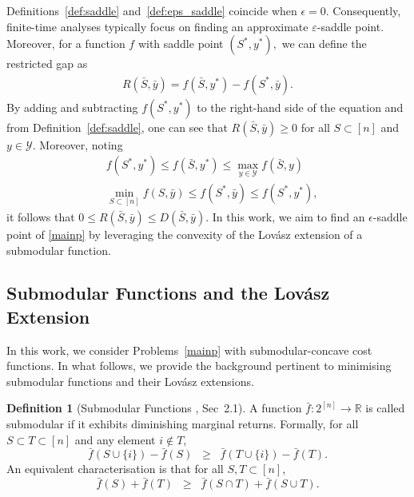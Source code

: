 \documentclass{article}
\theoremstyle{plain}
\theoremstyle{definition}
\newtheorem{definition}[theorem]{Definition}
\theoremstyle{remark}
\begin{document}
Definitions~\ref{def:saddle} and~\ref{def:eps_saddle} coincide when $\epsilon = 0$. Consequently, finite-time analyses typically focus on finding an approximate $\varepsilon$-saddle point. 
Moreover, for a function $f$ with saddle point $(S^\ast,y^\ast),$ we can define the restricted gap as 
\begin{align}\label{eq:RG}
    R(\bar{S},\bar{y}) = f(\bar{S},y^\ast)-f(S^\ast,\bar{y}).
\end{align}
By adding and subtracting $f(S^\ast,y^\ast)$ to the right-hand side of the equation and from Definition~\ref{def:saddle}, one can see that $R(\bar{S},\bar{y})\geq0$ for all $S\subset [n]$ %
and $y\in\mathcal{Y}.$ Moreover, noting  
\begin{align*}
    & f(S^{\ast}, y^\ast) \leq f(\bar{S}, y^{\ast}) \leq \max_{y\in\mathcal{Y}}f(\bar{S}, y)\\
    & \min_{S\subset [n]} f(S,\bar{y})\leq f(S^{\ast}, \bar{y}) \leq f(S^{\ast}, y^\ast),
\end{align*}
it follows that $0\leq R(\bar{S}, \bar{y})\leq D(\bar{S}, \bar{y})$.
In this work, we aim to find an $\epsilon$-saddle point of \eqref{mainp} by leveraging the convexity of the Lovász extension of a submodular function.

\subsection{Submodular Functions and the Lovász Extension}
 In this work, we consider Problems~\eqref{mainp} %
 with submodular-concave cost functions. In what follows, we provide the background pertinent to minimising submodular functions and their Lovász extensions.  %
\begin{definition}[Submodular Functions \cite{hazan2012online}, Sec~2.1]\label{def:sub}
    A function $\bar{f} : 2^{[n]} \to \mathbb{R}$ is called submodular if it exhibits diminishing marginal returns. 
Formally, for all $S \subset T \subset [n]$ and any element $i \notin T$,  
\[
    \bar{f}(S \cup \{i\}) - \bar{f}(S) \;\;\ge\;\; \bar{f}(T \cup \{i\}) - \bar{f}(T).
\]  
An equivalent characterisation is that for all $S, T \subset [n]$,  
\[
    \bar{f}(S) + \bar{f}(T) \;\;\ge\;\; \bar{f}(S \cap T) + \bar{f}(S \cup T).
\]  
\end{definition}
\end{document}

